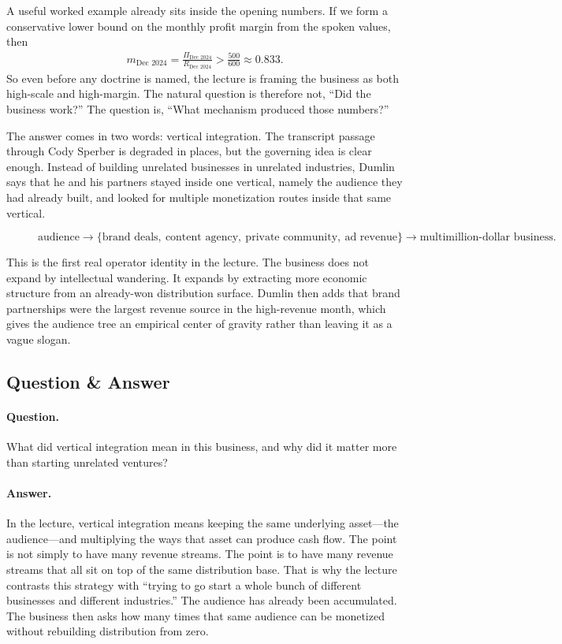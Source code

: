 A useful worked example already sits inside the opening numbers. If we form a conservative lower bound on the monthly profit margin from the spoken values, then
\begin{align}
m_{\text{Dec 2024}}
=
\frac{\Pi_{\text{Dec 2024}}}{R_{\text{Dec 2024}}}
>
\frac{500}{600}
\approx 0.833.
\end{align}
So even before any doctrine is named, the lecture is framing the business as both high-scale and high-margin. The natural question is therefore not, ``Did the business work?'' The question is, ``What mechanism produced those numbers?''

The answer comes in two words: vertical integration. The transcript passage through Cody Sperber is degraded in places, but the governing idea is clear enough. Instead of building unrelated businesses in unrelated industries, Dumlin says that he and his partners stayed inside one vertical, namely the audience they had already built, and looked for multiple monetization routes inside that same vertical.

\begin{figure}[h]
\centering
\begin{equation}
\text{audience}
\to
\{\text{brand deals},\ \text{content agency},\ \text{private community},\ \text{ad revenue}\}
\to
\text{multimillion-dollar business}.
\end{equation}
\end{figure}

This is the first real operator identity in the lecture. The business does not expand by intellectual wandering. It expands by extracting more economic structure from an already-won distribution surface. Dumlin then adds that brand partnerships were the largest revenue source in the high-revenue month, which gives the audience tree an empirical center of gravity rather than leaving it as a vague slogan.

\subsection{Question \& Answer}

\paragraph{Question.} What did vertical integration mean in this business, and why did it matter more than starting unrelated ventures?

\paragraph{Answer.} In the lecture, vertical integration means keeping the same underlying asset---the audience---and multiplying the ways that asset can produce cash flow. The point is not simply to have many revenue streams. The point is to have many revenue streams that all sit on top of the same distribution base. That is why the lecture contrasts this strategy with ``trying to go start a whole bunch of different businesses and different industries.'' The audience has already been accumulated. The business then asks how many times that same audience can be monetized without rebuilding distribution from zero.

